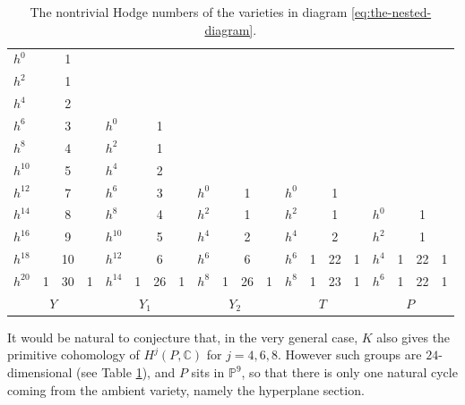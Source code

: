 \documentclass[11pt]{article}
\newcommand{\smaller}{\small}
\theoremstyle{plain}
\theoremstyle{definition}
\newcommand{\CC}{\mathbb{C}}
\newcommand{\PP}{\mathbb{P}}
\begin{document}
\begin{table}[htb]
\centering
\smaller\smaller
\begin{tabular}{||l | c c c  ||l | c c c  ||l | c c c  ||l | c c c  || l | c c c  ||}
\hline
$h^0$ & & 1 & &  & & & &  & & & &  & & & &  & & & \\
$h^2$ & & 1 & &  & & & &  & & & &  & & & &  & & &  \\
$h^4$ & & 2 & &  & & & &  & & & &  & & & &  & & &  \\
$h^6$ & & 3 & &  $h^0$ & & 1 & &  & & & &  & & & &  & & &  \\
$h^8$ & & 4 & &  $h^2$ & & 1 & &  & & & &  & & & &  & & & \\
$h^{10}$ & & 5 & &  $h^4$ & & 2 & &  & & & &  & & & &  & & & \\
$h^{12}$ & & 7 & &  $h^6$ & & 3 & &  $h^0$ & & 1 & &  $h^0$ & & 1 & &  & & & \\
$h^{14}$ & & 8 & &  $h^8$ & & 4 & &  $h^2$& & 1 & &  $h^2$& & 1 & &  $h^0$ & & 1 & \\
$h^{16}$ & & 9 & & $h^{10}$ & & 5 & &  $h^4$ & & 2 & &  $h^4$ & & 2 & &  $h^2$ & & 1 & \\
$h^{18}$ & & 10 & & $h^{12}$ & & 6 & & $h^6$ & & 6 & &  $h^6$ & 1 & 22 & 1& $h^4$ & 1 & 22 & 1 \\
$h^{20}$ & 1 & 30 & 1 &  $h^{14}$ & 1 & 26 & 1 &  $h^8$ & 1 & 26 & 1 &  $h^8$ & 1 & 23 & 1 & $h^6$ & 1 & 22 & 1 \\
\hline
\multicolumn{4}{||c||}{\multirow{2}{*}{$Y$}} & \multicolumn{4}{c||}{\multirow{2}{*}{$Y_1$}} & \multicolumn{4}{c||}{\multirow{2}{*}{$Y_2$}}& \multicolumn{4}{c||}{\multirow{2}{*}{$T$}} & \multicolumn{4}{c||}{\multirow{2}{*}{$P$}}\\
\multicolumn{4}{||c||}{} & \multicolumn{4}{c||}{} & \multicolumn{4}{c||}{} & \multicolumn{4}{c||}{} & \multicolumn{4}{c||}{} \\ \hline
\end{tabular}
\vspace*{5pt}
\caption{The nontrivial Hodge numbers of the varieties in diagram \eqref{eq:the-nested-diagram}.}\label{tab}
\vspace*{-1.5\baselineskip}
\end{table}

It would be natural to conjecture that, in the very general case, $K$ also gives the primitive
cohomology of $H^j(P,\CC)$ for $j=4,6,8$. However such groups are $24$\nobreakdash-dimen\-sional (see Table \ref{tab}),
and $P$ sits in $\PP^9$, so that there is only one natural cycle coming from the ambient variety,
namely the hyperplane section.
\end{document}
